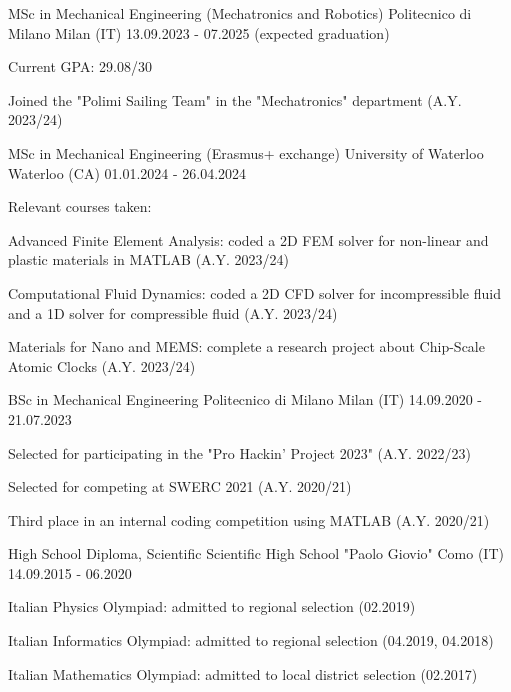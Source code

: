 
\begin{cventries}

  \cventry
  {MSc in Mechanical Engineering (Mechatronics and Robotics)}
  {Politecnico di Milano}
  {Milan (IT)}
  {13.09.2023 - 07.2025 (expected graduation)}
  {
    \begin{cvitems}
      \item {Current GPA: 29.08/30}
      \item {Joined the "Polimi Sailing Team" in the "Mechatronics" department (A.Y. 2023/24)}
    \end{cvitems}
  }

  \cventry
  {MSc in Mechanical Engineering (Erasmus+ exchange)}
  {University of Waterloo}
  {Waterloo (CA)}
  {01.01.2024 - 26.04.2024}
  {
    Relevant courses taken:
    \vspace{4mm}
    \begin{cvitems}
      \item {Advanced Finite Element Analysis: coded a 2D FEM solver for non-linear and plastic materials in MATLAB (A.Y. 2023/24)}
      \item {Computational Fluid Dynamics: coded a 2D CFD solver for incompressible fluid and a 1D solver for compressible fluid (A.Y. 2023/24)}
      \item {Materials for Nano and MEMS: complete a research project about Chip-Scale Atomic Clocks (A.Y. 2023/24)}
    \end{cvitems}
  }

  \cventry
  {BSc in Mechanical Engineering}
  {Politecnico di Milano}
  {Milan (IT)}
  {14.09.2020 - 21.07.2023}
  {
    \begin{cvitems}
      \item {Selected for participating in the "Pro Hackin' Project 2023" (A.Y. 2022/23)}
      \item {Selected for competing at SWERC 2021 (A.Y. 2020/21)}
      \item {Third place in an internal coding competition using MATLAB (A.Y. 2020/21)}
    \end{cvitems}
  }

  \cventry
  {High School Diploma, Scientific}
  {Scientific High School "Paolo Giovio"}
  {Como (IT)}
  {14.09.2015 - 06.2020}
  {
    \begin{cvitems}
      \item {Italian Physics Olympiad: admitted to regional selection (02.2019)}
      \item {Italian Informatics Olympiad: admitted to regional selection (04.2019, 04.2018)}
      \item {Italian Mathematics Olympiad: admitted to local district selection (02.2017)}
    \end{cvitems}
  }

\end{cventries}